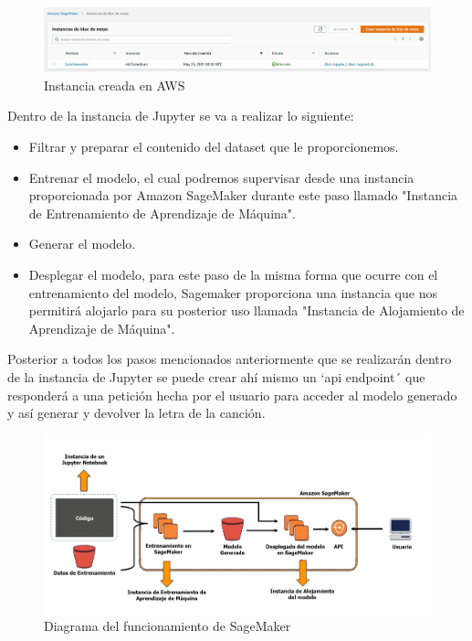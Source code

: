 \documentclass[12pt, a4paper, titlepage]{report}
\begin{document}
		\begin{figure}[H]
			\includegraphics[width=16cm]{./imagenes/Disenio/Iteracion_4/JupyterInstance.jpg}
			\centering 
			\caption{Instancia creada en AWS}
		\end{figure}
	
	Dentro de la instancia de Jupyter se va a realizar lo siguiente:
	
	\begin{itemize}
		\item Filtrar y preparar el contenido del dataset que le proporcionemos.
		\item Entrenar el modelo, el cual podremos supervisar desde una instancia proporcionada por Amazon SageMaker durante este paso llamado "Instancia de Entrenamiento de Aprendizaje de Máquina".
		\item Generar el modelo.
		\item Desplegar el modelo, para este paso de la misma forma que ocurre con el entrenamiento del modelo, Sagemaker proporciona una instancia que nos permitirá alojarlo para su posterior uso llamada "Instancia de Alojamiento de Aprendizaje de Máquina".
	\end{itemize}
	
	Posterior a todos los pasos mencionados anteriormente que se realizarán dentro de la instancia de Jupyter se puede crear ahí mismo un `\acrshort{api} endpoint´ que responderá a una petición hecha por el usuario para acceder al modelo generado y así generar y devolver la letra de la canción.
	
	\begin{figure}[H]
		\includegraphics[width=15cm]{./imagenes/Disenio/Iteracion_4/sagemaker_function.png}
		\centering 
		\caption{Diagrama del funcionamiento de SageMaker}
	\end{figure}
	
\end{document}
